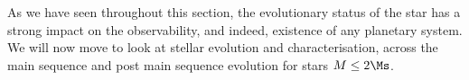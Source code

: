 As we have seen throughout this section, the evolutionary status of the star has a strong impact on the observability, and indeed, existence of any planetary system. We will now move to look at stellar evolution and characterisation, across the main sequence and post main sequence evolution for stars $M\leq2\Ms$.

